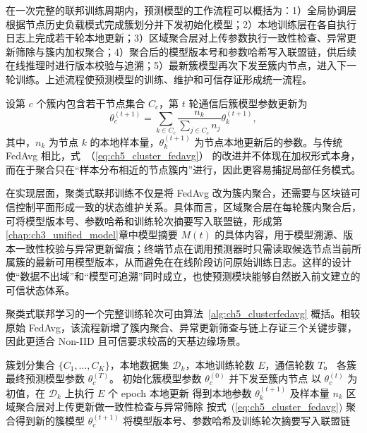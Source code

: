 在一次完整的联邦训练周期内，预测模型的工作流程可以概括为：1）全局协调层根据节点历史负载模式完成簇划分并下发初始化模型；2）本地训练层在各自执行日志上完成若干轮本地更新；3）区域聚合层对上传参数执行一致性检查、异常更新筛除与簇内加权聚合；4）聚合后的模型版本号和参数哈希写入联盟链，供后续在线推理时进行版本校验与追溯；5）最新簇模型再次下发至簇内节点，进入下一轮训练。上述流程使预测模型的训练、维护和可信存证形成统一流程。

设第 $c$ 个簇内包含若干节点集合 $C_c$，第 $t$ 轮通信后簇模型参数更新为
\begin{equation}
    \theta_c^{(t+1)} =
    \sum_{k \in C_c}
    \frac{n_k}{\sum_{j \in C_c}n_j}
    \theta_k^{(t+1)},
    \label{eq:ch5_cluster_fedavg}
\end{equation}
其中，$n_k$ 为节点 $k$ 的本地样本量，$\theta_k^{(t+1)}$ 为节点本地更新后的参数。与传统 FedAvg 相比，式~（\ref{eq:ch5_cluster_fedavg}） 的改进并不体现在加权形式本身，而在于聚合只在“样本分布相近的节点簇内”进行，因此更容易捕捉局部任务模式。

在实现层面，聚类式联邦训练不仅是将 FedAvg 改为簇内聚合，还需要与区块链可信控制平面形成一致的状态维护关系。具体而言，区域聚合层在每轮簇内聚合后，可将模型版本号、参数哈希和训练轮次摘要写入联盟链，形成第\ref{chap:ch3_unified_model}章中模型摘要 $M(t)$ 的具体内容，用于模型溯源、版本一致性校验与异常更新留痕；终端节点在调用预测器时只需读取候选节点当前所属簇的最新可用模型版本，从而避免在在线阶段访问原始训练日志。这样的设计使“数据不出域”和“模型可追溯”同时成立，也使预测模块能够自然嵌入前文建立的可信状态体系。

聚类式联邦学习的一个完整训练轮次可由算法~\ref{alg:ch5_clusterfedavg} 概括。相较原始 FedAvg，该流程新增了簇内聚合、异常更新筛查与链上存证三个关键步骤，因此更适合 Non-IID 且可信要求较高的天基边缘场景。

\begin{algorithm}[H]
    \caption{聚类式联邦学习（Clustered FedAvg）训练流程}
    \label{alg:ch5_clusterfedavg}
    \small
    \begin{algorithmic}[1]
        簇划分集合 $\{C_1,\ldots,C_K\}$，本地数据集 $\mathcal{D}_k$，本地训练轮数 $E$，通信轮数 $T$。
        各簇最终预测模型参数 $\theta_c^{(T)}$。
        \State 初始化簇模型参数 $\theta_c^{(0)}$ 并下发至簇内节点
        \EndFor
        \State 以 $\theta_c^{(t)}$ 为初值，在 $\mathcal{D}_k$ 上执行 $E$ 个 epoch 本地更新
        \State 得到本地参数 $\theta_k^{(t+1)}$ 及样本量 $n_k$
        \EndFor
        \State 区域聚合层对上传更新做一致性检查与异常筛除
        \State 按式~(\ref{eq:ch5_cluster_fedavg}) 聚合得到新的簇模型 $\theta_c^{(t+1)}$
        \State 将模型版本号、参数哈希及训练轮次摘要写入联盟链
        \EndFor
        \EndFor
    \end{algorithmic}
\end{algorithm}

